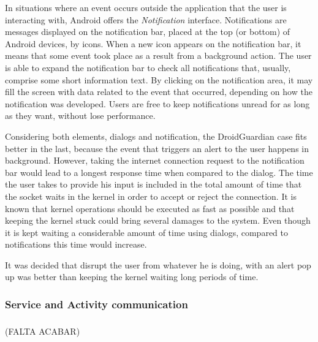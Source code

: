 In situations where an event occurs outside the application that the user is interacting with, Android offers the \textit{Notification} interface. Notifications are messages displayed on the notification bar, placed at the top (or bottom) of Android devices, by icons. When a new icon appears on the notification bar, it means that some event took place as a result from a background action. The user is able to expand the notification bar to check all notifications that, usually, comprise some short information text. By clicking on the notification area, it may fill the screen with data related to the event that occurred, depending on how the notification was developed. Users are free to keep notifications unread for as long as they want, without lose performance.

Considering both elements, dialogs and notification, the DroidGuardian case fits better in the last, because the event that triggers an alert to the user happens in background. However, taking the internet connection request to the notification bar would lead to a longest response time when compared to the dialog. The time the user takes to provide his input is included in the total amount of time that the socket waits in the kernel in order to accept or reject the connection. It is known that kernel operations should be executed as fast as possible and that keeping the kernel stuck could bring several damages to the system. Even though it is kept waiting a considerable amount of time using dialogs, compared to notifications this time would increase. 

It was decided that disrupt the user from whatever he is doing, with an alert pop up was better than keeping the kernel waiting long periods of time.

\subsubsection{Service and Activity communication}

\subsubsection{}
(FALTA ACABAR) 
